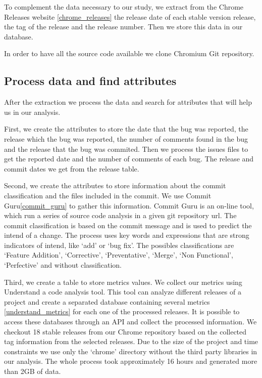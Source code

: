 To complement the data necessary to our study, we extract from the Chrome Releases website \ref{chrome_releases} the release date of each stable version release, the tag of the release and the release number. Then we store this data in our database.
 
In order to have all the source code available we clone Chromium Git repository. 

\subsection{Process data and find attributes}

After the extraction we process the data and search for attributes that will help us in our analysis. 

First, we create the attributes to store the date that the bug was reported, the release which the bug was reported, the number of comments found in the bug and the release that the bug was commited. Then we process the issues files to get the reported date and the number of comments of each bug. The release and commit dates we get from the release table. 

Second, we create the attributes to store information about the commit classification and the files included in the commit. We use Commit Guru\ref{commit_guru} to gather this information. Commit Guru is an on-line tool, which run a series of source code analysis in a given git repository url. The commit classification is based on the commit message and is used to predict the intend of a change. The process uses key words and expressions that are strong indicators of intend, like `add' or `bug fix'. The possibles classifications are `Feature Addition', `Corrective', `Preventative', `Merge', `Non Functional', `Perfective' and without classification.

Third, we create a table to store metrics values. We collect our metrics using Understand a code analysis tool. This tool can analyze different releases of a project and create a separated database containing several metrics \ref{understand_metrics} for each one of the processed releases. It is possible to access these databases through an API and collect the processed information. We checkout 18 stable releases from our Chrome repository based on the collected tag information from the selected releases. Due to the size of the project and time constraints we use only the `chrome' directory without the third party libraries in our analysis. The whole process took approximately 16 hours and generated more than 2GB of data. 

